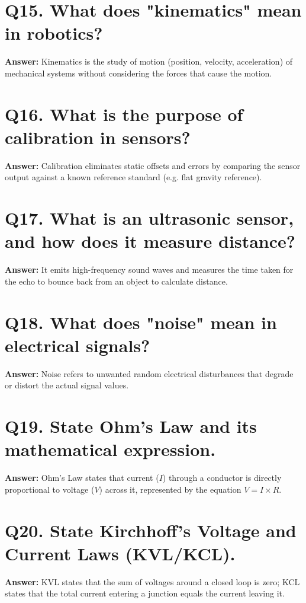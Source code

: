 \documentclass[12pt,a4paper,oneside]{report}
\begin{document}
\section{Q15. What does "kinematics" mean in robotics?}
\textbf{Answer:} Kinematics is the study of motion (position, velocity, acceleration) of mechanical systems without considering the forces that cause the motion.

\section{Q16. What is the purpose of calibration in sensors?}
\textbf{Answer:} Calibration eliminates static offsets and errors by comparing the sensor output against a known reference standard (e.g. flat gravity reference).

\section{Q17. What is an ultrasonic sensor, and how does it measure distance?}
\textbf{Answer:} It emits high-frequency sound waves and measures the time taken for the echo to bounce back from an object to calculate distance.

\section{Q18. What does "noise" mean in electrical signals?}
\textbf{Answer:} Noise refers to unwanted random electrical disturbances that degrade or distort the actual signal values.

\section{Q19. State Ohm's Law and its mathematical expression.}
\textbf{Answer:} Ohm's Law states that current ($I$) through a conductor is directly proportional to voltage ($V$) across it, represented by the equation $V = I \times R$.

\section{Q20. State Kirchhoff's Voltage and Current Laws (KVL/KCL).}
\textbf{Answer:} KVL states that the sum of voltages around a closed loop is zero; KCL states that the total current entering a junction equals the current leaving it.

\end{document}
